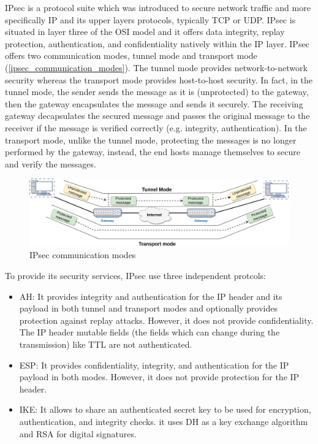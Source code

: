 \ac{IPsec} is a protocol suite which was introduced to secure network traffic and more specifically \ac{IP} and its
upper layers protocols, typically \ac{TCP} or \ac{UDP}. \ac{IPsec} is situated in layer three of the OSI model and it offers data
integrity, replay protection, authentication, and confidentiality natively within the \ac{IP} layer. \ac{IPsec}
offers two communication modes, tunnel mode and transport mode (\autoref{ipsec_communication_modes}).
The tunnel mode provides network-to-network security whereas the transport mode provides host-to-host security.
In fact, in the tunnel mode, the sender sends the message as it is (unprotected) to the gateway, then the gateway encapsulates the message
and sends it securely. The receiving gateway decapsulates the secured message and passes the original message to the receiver if
the message is verified correctly (e.g. integrity, authentication). In the transport mode, unlike the tunnel mode, protecting
the messages is no longer performed by the gateway, instead, the end hosts manage themselves to secure and verify the messages.

 \begin{figure}[!htbp]
 \centering
 \includegraphics[width=16cm]{figures/IPsec/ipsec_modes.jpg}
 \caption{IPsec communication modes}\label{ipsec_communication_modes}
 \end{figure}

 To provide its security services, \ac{IPsec} use three independent protcols:

 \begin{itemize}
 \setlength{\labelwidth}{10pt}
   \item \ac{AH}: It provides integrity and authentication for the \ac{IP} header and its payload in both tunnel and transport modes and optionally provides protection against replay attacks. However, it does not provide confidentiality. The \ac{IP} header mutable fields (the fields which can change during the transmission) like
   \ac{TTL} are not authenticated.
   \item \ac{ESP}: It provides confidentiality, integrity, and authentication for the \ac{IP} payload in both modes.
   However, it does not provide protection for the \ac{IP} header.
   \item \ac{IKE}: It allows to share an authenticated secret key to be used for encryption, authentication, and integrity checks.
   it uses DH as a key exchange algorithm and RSA for digital signatures.
 \end{itemize}

